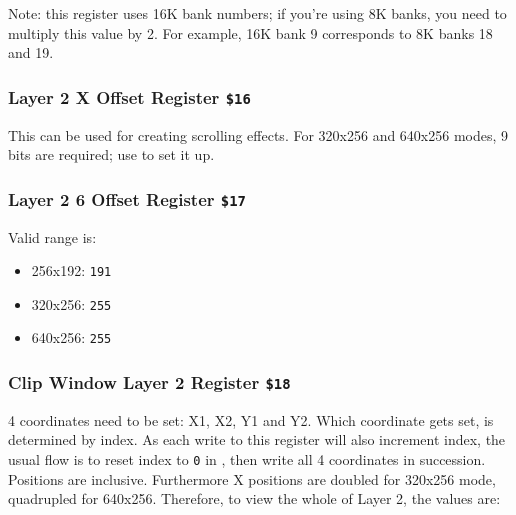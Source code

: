 \documentclass[12pt,twoside,openright,a4paper]{book}
\begin{document}
Note: this register uses 16K bank numbers; if you're using 8K banks, you need to multiply this value by 2. For example, 16K bank 9 corresponds to 8K banks 18 and 19.


\subsubsection{Layer 2 X Offset Register {\tt \$16}}

\begin{NextPort}
\end{NextPort}

This can be used for creating scrolling effects. For 320x256 and 640x256 modes, 9 bits are required; use  to set it up.


\subsubsection{Layer 2 6 Offset Register {\tt \$17}}

\begin{NextPort}
\end{NextPort}

Valid range is:

\begin{itemize}[topsep=1pt,itemsep=1pt]
	\item 256x192: {\tt 191}
	\item 320x256: {\tt 255}
	\item 640x256: {\tt 255}
\end{itemize}


\subsubsection{Clip Window Layer 2 Register {\tt \$18}}

\begin{NextPort}
\end{NextPort}

4 coordinates need to be set: X1, X2, Y1 and Y2. Which coordinate gets set, is determined by index. As each write to this register will also increment index, the usual flow is to reset index to {\tt 0} in , then write all 4 coordinates in succession. Positions are inclusive. Furthermore X positions are doubled for 320x256 mode, quadrupled for 640x256. Therefore, to view the whole of Layer 2, the values are:
\end{document}

